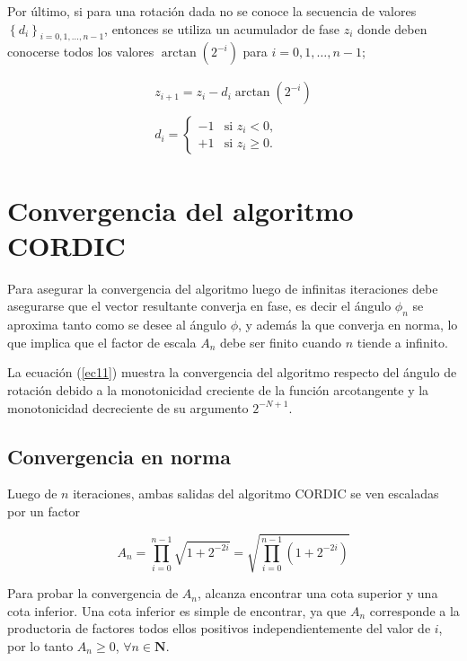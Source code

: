 Por último, si para una rotación dada no se conoce la secuencia de valores $\left\{d_{i}\right\}_{i=0,1, \ldots ,n-1}$,
entonces se utiliza un acumulador de fase $z_{i}$ donde deben conocerse todos los valores $\arctan\left( 2^{-i} \right)$
para $i=0,1, \ldots, n-1$;

\begin{equation}
\begin{array}{l}
z_{i+1}=z_i-d_i\arctan \left( 2^{-i} \right)\\
\\
d_i=\left\{ 
	\begin{array}{ll}
	-1 & \mbox{si } z_{i} < 0,\\
	+1 & \mbox{si } z_{i} \ge 0.
	\end{array} \right.
\end{array}
\end{equation}

\section{Convergencia del algoritmo CORDIC}

Para asegurar la convergencia del algoritmo luego de infinitas iteraciones debe asegurarse que el vector resultante
converja en fase, es decir el ángulo $\phi_n$ se aproxima tanto como se desee al ángulo $\phi$, y además la que converja
en norma, lo que implica que el factor de escala $A_{n}$ debe ser finito cuando $n$ tiende a infinito.

La ecuación (\ref{ec11}) muestra la convergencia del algoritmo respecto del ángulo de rotación debido a la monotonicidad
creciente de la función arcotangente y la monotonicidad decreciente de su argumento $2^{-N+1}$.

\subsection{Convergencia en norma}
Luego de $n$ iteraciones, ambas salidas del algoritmo CORDIC se ven escaladas por un
factor

\begin{equation}
A_{n}=\prod_{i=0}^{n-1}\sqrt{1+2^{-2i}}= \sqrt{\prod_{i=0}^{n-1} \left(1+2^{-2i}\right)}
\end{equation}

Para probar la convergencia de $A_{n}$, alcanza encontrar una cota superior y una cota inferior. Una cota inferior es
simple de encontrar, ya que $A_{n}$
corresponde a la productoria de factores todos ellos positivos independientemente del valor de $i$, por lo tanto
$A_{n}\geq 0$, $\forall n \in \mathbf{N}$.

